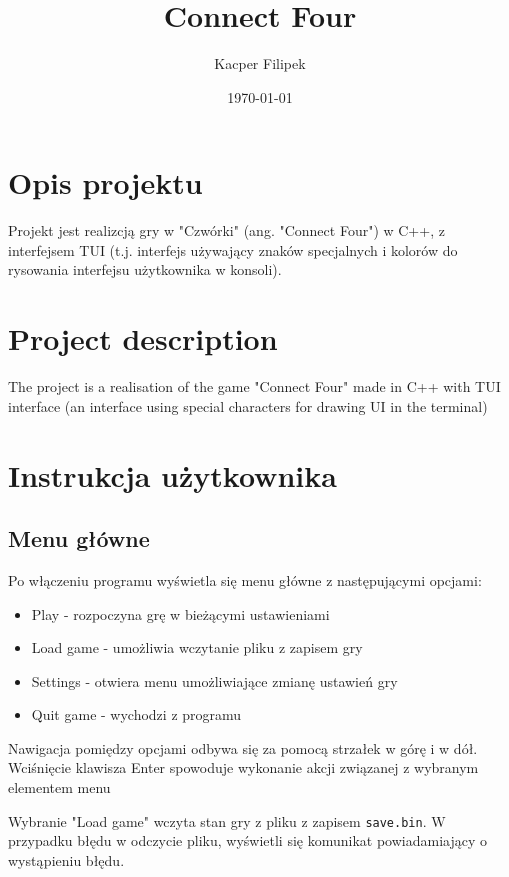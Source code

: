 \documentclass{article}
\title{Connect Four}
\author{Kacper Filipek}
\date{\today}
\begin{document}
\selectfont

\maketitle

\newpage

\section{Opis projektu}

Projekt jest realizcją gry w "Czwórki" (ang. "Connect Four") w C++, z interfejsem TUI (t.j. interfejs używający znaków 
specjalnych i kolorów do rysowania interfejsu użytkownika w konsoli). 

\section{Project description}

The project is a realisation of the game "Connect Four" made in C++ with TUI interface (an interface using special 
characters for drawing UI in the terminal)

\section{Instrukcja użytkownika}
\subsection*{Menu główne}

Po włączeniu programu wyświetla się menu główne z następującymi opcjami:
\begin{itemize}
    \item Play - rozpoczyna grę w bieżącymi ustawieniami
    \item Load game - umożliwia wczytanie pliku z zapisem gry
    \item Settings - otwiera menu umożliwiające zmianę ustawień gry
    \item Quit game - wychodzi z programu
\end{itemize}

Nawigacja pomiędzy opcjami odbywa się za pomocą strzałek w górę i w dół. Wciśnięcie klawisza Enter spowoduje wykonanie 
akcji związanej z wybranym elementem menu

Wybranie "Load game" wczyta stan gry z pliku z zapisem \texttt{save.bin}. 
W przypadku błędu w odczycie pliku, wyświetli się komunikat powiadamiający o wystąpieniu błędu.
\end{document}
